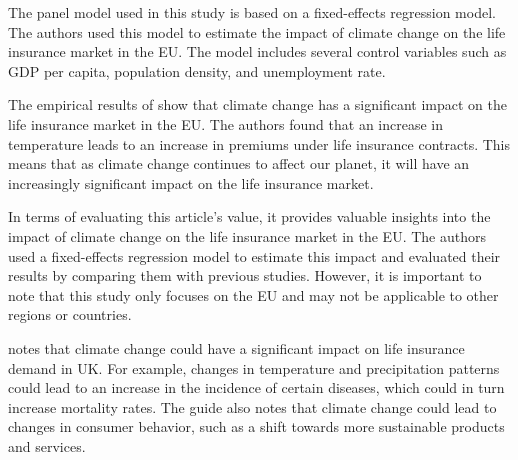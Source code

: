 \documentclass[a4paper,12pt]{article}
\begin{document}
The panel model used in this study is based on a fixed-effects regression model. The authors used this model to estimate the impact of climate change on the life insurance market in the EU. The model includes several control variables such as GDP per capita, population density, and unemployment rate.

The empirical results of \cite{melnychenko2021influence} show that climate change has a significant impact on the life insurance market in the EU. The authors found that an increase in temperature leads to an increase in premiums under life insurance contracts. This means that as climate change continues to affect our planet, it will have an increasingly significant impact on the life insurance market.

In terms of evaluating this article’s value, it provides valuable insights into the impact of climate change on the life insurance market in the EU. The authors used a fixed-effects regression model to estimate this impact and evaluated their results by comparing them with previous studies. However, it is important to note that this study only focuses on the EU and may not be applicable to other regions or countries.

\cite{ford2019practical} notes that climate change could have a significant impact on life insurance demand in UK. For example, changes in temperature and precipitation patterns could lead to an increase in the incidence of certain diseases, which could in turn increase mortality rates. The guide also notes that climate change could lead to changes in consumer behavior, such as a shift towards more sustainable products and services.
\end{document}
